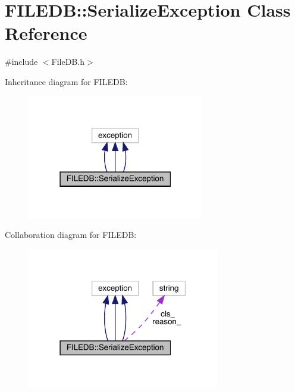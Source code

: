 \hypertarget{classFILEDB_1_1SerializeException}{}\section{F\+I\+L\+E\+DB\+:\+:Serialize\+Exception Class Reference}
\label{classFILEDB_1_1SerializeException}


{\ttfamily \#include $<$File\+D\+B.\+h$>$}



Inheritance diagram for F\+I\+L\+E\+DB\+:
\nopagebreak
\begin{figure}[H]
\begin{center}
\leavevmode
\includegraphics[width=219pt]{d8/d5c/classFILEDB_1_1SerializeException__inherit__graph}
\end{center}
\end{figure}


Collaboration diagram for F\+I\+L\+E\+DB\+:
\nopagebreak
\begin{figure}[H]
\begin{center}
\leavevmode
\includegraphics[width=238pt]{d2/de0/classFILEDB_1_1SerializeException__coll__graph}
\end{center}
\end{figure}
